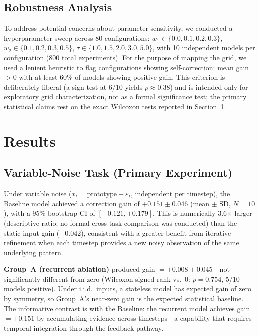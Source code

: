 \documentclass[10pt]{article}
\begin{document}
\subsection{Robustness Analysis}
\label{sec:robustness_analysis}

To address potential concerns about parameter sensitivity, we conducted a hyperparameter sweep across 80 configurations: $w_1 \in \{0.0, 0.1, 0.2, 0.3\}$, $w_2 \in \{0.1, 0.2, 0.3, 0.5\}$, $\tau \in \{1.0, 1.5, 2.0, 3.0, 5.0\}$, with 10 independent models per configuration (800 total experiments). For the purpose of mapping the grid, we used a lenient heuristic to flag configurations showing self-correction: mean gain $> 0$ with at least 60\% of models showing positive gain. This criterion is deliberately liberal (a sign test at 6/10 yields $p \approx 0.38$) and is intended only for exploratory grid characterization, not as a formal significance test; the primary statistical claims rest on the exact Wilcoxon tests reported in Section~\ref{sec:results}.

\section{Results}
\label{sec:results}

\subsection{Variable-Noise Task (Primary Experiment)}
\label{sec:vn_results}

Under variable noise ($x_t = \text{prototype} + \varepsilon_t$, independent per timestep), the Baseline model achieved a correction gain of $\mathbf{+0.151 \pm 0.046}$ (mean $\pm$ SD, $N{=}10$), with a 95\% bootstrap CI of $[+0.121, +0.179]$. This is numerically 3.6$\times$ larger (descriptive ratio; no formal cross-task comparison was conducted) than the static-input gain ($+0.042$), consistent with a greater benefit from iterative refinement when each timestep provides a new noisy observation of the same underlying pattern.

\textbf{Group~A (recurrent ablation)} produced gain $= +0.008 \pm 0.045$---not significantly different from zero (Wilcoxon signed-rank vs.\ 0: $p = 0.754$, 5/10 models positive). Under i.i.d.\ inputs, a stateless model has expected gain of zero by symmetry, so Group~A's near-zero gain is the expected statistical baseline. The informative contrast is with the Baseline: the recurrent model achieves gain $= +0.151$ by accumulating evidence across timesteps---a capability that requires temporal integration through the feedback pathway.
\end{document}
